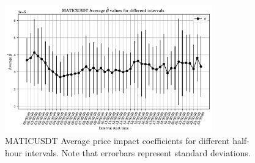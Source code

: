\begin{figure}[htpb]
    \centering
    \includegraphics[width=0.8\textwidth]{./images/MATICUSDT_beta_across_time.pdf}
    \caption{MATICUSDT Average price impact coefficients for different half-hour intervals. Note that errorbars represent standard deviations.}
    \label{fig:MATICUSDT_beta_across_time}
\end{figure}


